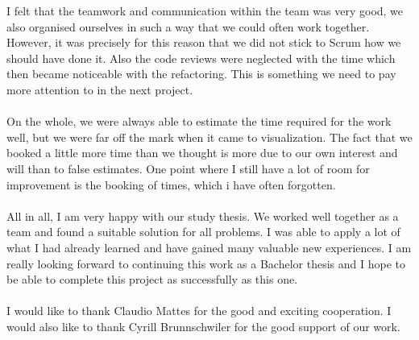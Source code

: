 I felt that the teamwork and communication within the team was very good, we also organised ourselves in such a way that we could often work together. However, it was precisely for this reason that we did not stick to Scrum how we should have done it. Also the code reviews were neglected with the time which then became noticeable with the refactoring. This is something we need to pay more attention to in the next project.
\\\\
On the whole, we were always able to estimate the time required for the work well, but we were far off the mark when it came to visualization. The fact that we booked a little more time than we thought is more due to our own interest and will than to false estimates. One point where I still have a lot of room for improvement is the booking of times, which i have often forgotten.
\\\\
All in all, I am very happy with our study thesis. We worked well together as a team and found a suitable solution for all problems. I was able to apply a lot of what I had already learned and have gained many valuable new experiences. I am really looking forward to continuing this work as a Bachelor thesis and I hope to be able to complete this project as successfully as this one.
\\\\
I would like to thank Claudio Mattes for the good and exciting cooperation. I would also like to thank Cyrill Brunnschwiler for the good support of our work.
